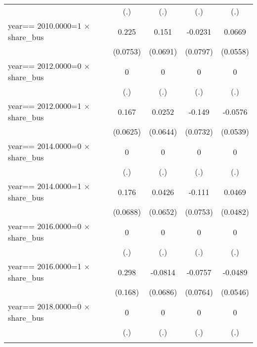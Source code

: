 \begin{table}[htbp]
\begin{tabular}{l*{4}{c}}
                &      (.)         &      (.)         &      (.)         &      (.)         \\
\addlinespace
year==  2010.0000=1 $\times$ share\_bus&    0.225\sym{***}&    0.151\sym{**} &  -0.0231         &   0.0669         \\
                & (0.0753)         & (0.0691)         & (0.0797)         & (0.0558)         \\
\addlinespace
year==  2012.0000=0 $\times$ share\_bus&        0         &        0         &        0         &        0         \\
                &      (.)         &      (.)         &      (.)         &      (.)         \\
\addlinespace
year==  2012.0000=1 $\times$ share\_bus&    0.167\sym{***}&   0.0252         &   -0.149\sym{**} &  -0.0576         \\
                & (0.0625)         & (0.0644)         & (0.0732)         & (0.0539)         \\
\addlinespace
year==  2014.0000=0 $\times$ share\_bus&        0         &        0         &        0         &        0         \\
                &      (.)         &      (.)         &      (.)         &      (.)         \\
\addlinespace
year==  2014.0000=1 $\times$ share\_bus&    0.176\sym{**} &   0.0426         &   -0.111         &   0.0469         \\
                & (0.0688)         & (0.0652)         & (0.0753)         & (0.0482)         \\
\addlinespace
year==  2016.0000=0 $\times$ share\_bus&        0         &        0         &        0         &        0         \\
                &      (.)         &      (.)         &      (.)         &      (.)         \\
\addlinespace
year==  2016.0000=1 $\times$ share\_bus&    0.298\sym{*}  &  -0.0814         &  -0.0757         &  -0.0489         \\
                &  (0.168)         & (0.0686)         & (0.0764)         & (0.0546)         \\
\addlinespace
year==  2018.0000=0 $\times$ share\_bus&        0         &        0         &        0         &        0         \\
                &      (.)         &      (.)         &      (.)         &      (.)         \\
\addlinespace

\end{tabular}
\end{table}
